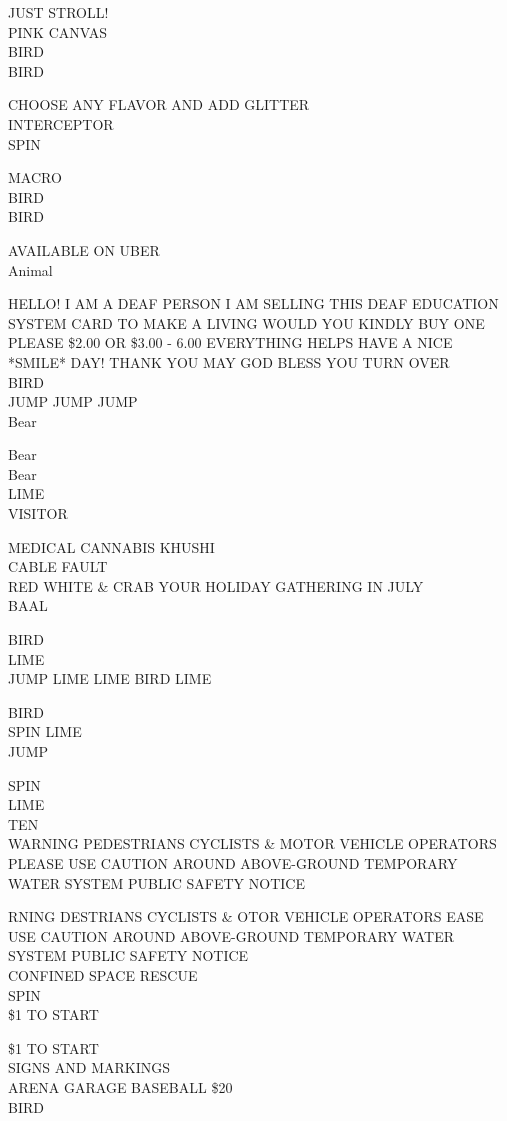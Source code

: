 \documentclass[10pt,letterpaper]{article}
\begin{document}
JUST STROLL!\\
PINK CANVAS\\
BIRD\\
BIRD

CHOOSE ANY FLAVOR AND ADD GLITTER\\
INTERCEPTOR\\
SPIN

MACRO\\
BIRD\\
BIRD

AVAILABLE ON UBER\\
Animal

HELLO!  I AM A DEAF PERSON I AM SELLING THIS DEAF EDUCATION SYSTEM CARD TO MAKE A LIVING WOULD YOU KINDLY BUY ONE PLEASE \$2.00 OR \$3.00 {-} 6.00 EVERYTHING HELPS HAVE A NICE *SMILE* DAY!  THANK YOU MAY GOD BLESS YOU TURN OVER\\
BIRD\\
JUMP JUMP JUMP\\
Bear

Bear\\
Bear\\
LIME\\
VISITOR

MEDICAL CANNABIS KHUSHI\\
CABLE FAULT\\
RED WHITE \& CRAB YOUR HOLIDAY GATHERING IN JULY\\
BAAL

BIRD\\
LIME\\
JUMP LIME LIME BIRD LIME

BIRD\\
SPIN LIME\\
JUMP

SPIN\\
LIME\\
TEN\\
WARNING PEDESTRIANS CYCLISTS \& MOTOR VEHICLE OPERATORS PLEASE USE CAUTION AROUND ABOVE{-}GROUND TEMPORARY WATER SYSTEM PUBLIC SAFETY NOTICE

RNING DESTRIANS CYCLISTS \& OTOR VEHICLE OPERATORS EASE USE CAUTION AROUND ABOVE{-}GROUND TEMPORARY WATER SYSTEM PUBLIC SAFETY NOTICE\\
CONFINED SPACE RESCUE\\
SPIN\\
\$1 TO START

\$1 TO START\\
SIGNS AND MARKINGS\\
ARENA GARAGE BASEBALL \$20\\
BIRD
\end{document}
